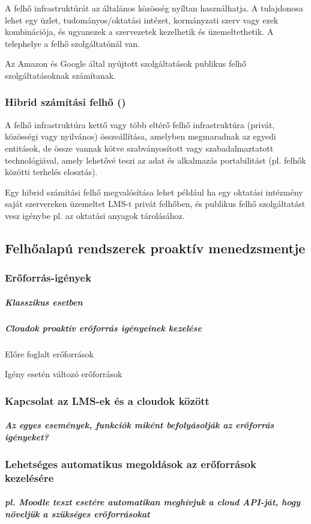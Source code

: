 A felhő infrastruktúrát az általános közösség nyíltan használhatja. A tulajdonosa lehet egy üzlet, tudományos/oktatási intézet, kormányzati szerv vagy ezek kombinációja, és ugyanezek a szervezetek kezelhetik és üzemeltethetik. A telephelye a felhő szolgáltatónál van.

Az Amazon és Google által nyújtott szolgáltatások publikus felhő szolgáltatásoknak számítanak.

\subsubsection{Hibrid számítási felhő ()}

A felhő infrastruktúra kettő vagy több eltérő felhő infrastruktúra (privát, közösségi vagy nyilvános) összeállítása, amelyben megmaradnak az egyedi entitások, de össze vannak kötve szabványosított vagy szabadalmaztatott technológiával, amely lehetővé teszi az adat és alkalmazás portabilitást (pl. felhők közötti terhelés elosztás).

Egy hibrid számítási felhő megvalósítása lehet például ha egy oktatási intézmény saját szervereken üzemeltet LMS-t privát felhőben, és publikus felhő szolgáltatást vesz igénybe pl. az oktatási anyagok tárolásához.


\subsection{Felhőalapú rendszerek proaktív menedzsmentje}

\subsubsection{Erőforrás-igények}
\subparagraph{Klasszikus esetben}
\subparagraph{Cloudok proaktív erőforrás igényeinek kezelése}

Előre foglalt erőforrások
        
Igény esetén változó erőforrások

\subsubsection{Kapcsolat az LMS-ek és a cloudok között}
\subparagraph{Az egyes események, funkciók miként befolyásolják az erőforrás igényeket?}

\subsubsection{Lehetséges automatikus megoldások az erőforrások kezelésére}
\subparagraph{pl. Moodle teszt esetére automatikan meghívjuk a cloud API-ját, hogy növeljük a szükséges erőforrásokat}
